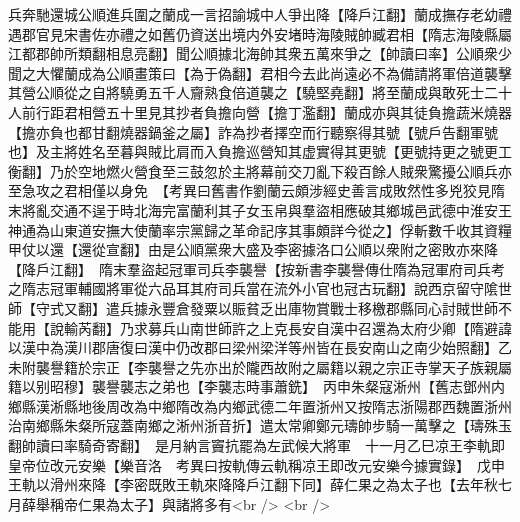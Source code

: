 兵奔馳還城公順進兵圍之蘭成一言招諭城中人爭出降【降戶江翻】蘭成撫存老幼禮遇郡官見宋書佐亦禮之如舊仍資送出境内外安堵時海陵賊帥臧君相【隋志海陵縣屬江都郡帥所類翻相息亮翻】聞公順據北海帥其衆五萬來爭之【帥讀曰率】公順衆少聞之大懼蘭成為公順畫策曰【為于偽翻】君相今去此尚遠必不為備請將軍倍道襲擊其營公順從之自將驍勇五千人齎熟食倍道襲之【驍堅堯翻】將至蘭成與敢死士二十人前行距君相營五十里見其抄者負擔向營【擔丁濫翻】蘭成亦與其徒負擔蔬米燒器【擔亦負也都甘翻燒器鍋釜之屬】詐為抄者擇空而行聽察得其號【號戶告翻軍號也】及主將姓名至暮與賊比肩而入負擔巡營知其虚實得其更號【更號持更之號更工衡翻】乃於空地燃火營食至三鼓忽於主將幕前交刀亂下殺百餘人賊衆驚擾公順兵亦至急攻之君相僅以身免　【考異曰舊書作劉蘭云頗涉經史善言成敗然性多兇狡見隋末將亂交通不逞于時北海完富蘭利其子女玉帛與羣盜相應破其鄉城邑武德中淮安王神通為山東道安撫大使蘭率宗黨歸之革命記序其事頗詳今從之】俘斬數千收其資糧甲仗以還【還從宣翻】由是公順黨衆大盛及李密據洛口公順以衆附之密敗亦來降【降戶江翻】　隋末羣盜起冠軍司兵李襲譽【按新書李襲譽傳仕隋為冠軍府司兵考之隋志冠軍輔國將軍從六品耳其府司兵當在流外小官也冠古玩翻】說西京留守隂世師【守式又翻】遣兵據永豐倉發粟以賑貧乏出庫物賞戰士移檄郡縣同心討賊世師不能用【說輸芮翻】乃求募兵山南世師許之上克長安自漢中召還為太府少卿【隋避諱以漢中為漢川郡唐復曰漢中仍改郡曰梁州梁洋等州皆在長安南山之南少始照翻】乙未附襲譽籍於宗正【李襲譽之先亦出於隴西故附之屬籍以親之宗正寺掌天子族親屬籍以别昭穆】襲譽襲志之弟也【李襲志時事蕭銑】　丙申朱粲寇淅州【舊志鄧州内鄉縣漢淅縣地後周改為中鄉隋改為内鄉武德二年置浙州又按隋志浙陽郡西魏置浙州治南鄉縣朱粲所寇蓋南鄉之淅州浙音折】遣太常卿鄭元璹帥步騎一萬擊之【璹殊玉翻帥讀曰率騎奇寄翻】　是月納言竇抗罷為左武候大將軍　十一月乙巳凉王李軌即皇帝位改元安樂【樂音洛　考異曰按軌傳云軌稱凉王即改元安樂今據實錄】　戊申王軌以滑州來降【李密既敗王軌來降降戶江翻下同】薛仁果之為太子也【去年秋七月薛舉稱帝仁果為太子】與諸將多有<br />
<br />
